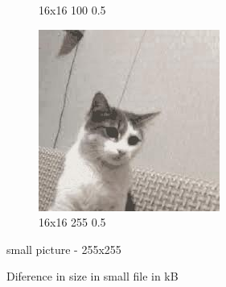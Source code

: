 \documentclass[12pt,a4paper]{article}
\begin{document}
\begin{figure}[htb]
\begin{subfigure}{0.25\textwidth}
  \caption{16x16 100 0.5}
  \label{fig:6}
\end{subfigure}
\begin{subfigure}{0.25\textwidth}
  \includegraphics[width=\linewidth]{images/small/16-16-255-05}
  \caption{16x16 255 0.5}
  \label{fig:5}
\end{subfigure}\hfil %


\caption{small picture - 255x255}
\label{fig:images}
\end{figure}

\begin{figure}
    \begin{bchart}[max=150]
            \smallskip
            \smallskip
            \smallskip
            \smallskip
            \smallskip
            \smallskip
            \smallskip
            \smallskip
            \smallskip
            \smallskip
            \smallskip
            \smallskip
    \end{bchart}    
        \caption{Diference in size in small file in kB}
    \end{figure}
    
\end{document}
